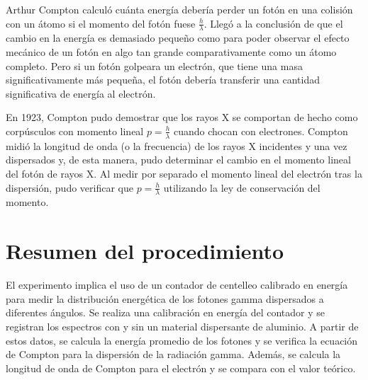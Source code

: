 \documentclass[letterpaper, 12pt]{article}
\begin{document}
Arthur Compton calculó cuánta energía debería perder un
fotón en una colisión con un átomo si el momento del fotón
fuese $\frac{h}{\lambda}$. Llegó a la conclusión de que el
cambio en la energía es demasiado pequeño como para poder
observar el efecto mecánico de un fotón en algo tan grande
comparativamente como un átomo completo. Pero si un fotón
golpeara un electrón, que tiene una masa significativamente
más pequeña, el fotón debería transferir una cantidad
significativa de energía al electrón.

En 1923, Compton pudo demostrar que los rayos X se
comportan de hecho como corpúsculos con momento lineal $p =
      \frac{h}{\lambda}$ cuando chocan con electrones. Compton
midió la longitud de onda (o la frecuencia) de los rayos X
incidentes y una vez dispersados y, de esta manera, pudo
determinar el cambio en el momento lineal del fotón de
rayos X. Al medir por separado el momento lineal del
electrón tras la dispersión, pudo verificar que $p =
      \frac{h}{\lambda}$ utilizando la ley de conservación del
momento.

\section{Resumen del procedimiento}

El experimento implica el uso de un contador de centelleo
calibrado en energía para medir la distribución energética
de los fotones gamma dispersados a diferentes ángulos. Se
realiza una calibración en energía del contador y se
registran los espectros con y sin un material dispersante
de aluminio. A partir de estos datos, se calcula la energía
promedio de los fotones y se verifica la ecuación de
Compton para la dispersión de la radiación gamma. Además,
se calcula la longitud de onda de Compton para el electrón
y se compara con el valor teórico.

\printbibliography
\end{document}
